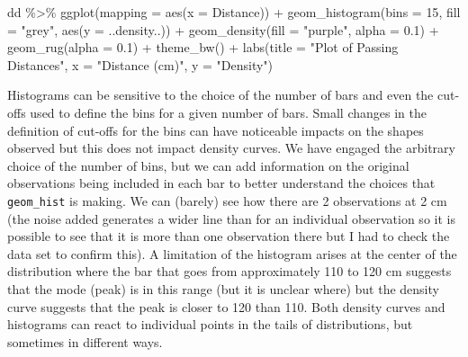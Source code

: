 \documentclass[
]{book}
\newenvironment{Shaded}{\begin{snugshade}}{\end{snugshade}}
\newcommand{\AttributeTok}[1]{\textcolor[rgb]{0.77,0.63,0.00}{#1}}
\newcommand{\DecValTok}[1]{\textcolor[rgb]{0.00,0.00,0.81}{#1}}
\newcommand{\FloatTok}[1]{\textcolor[rgb]{0.00,0.00,0.81}{#1}}
\newcommand{\FunctionTok}[1]{\textcolor[rgb]{0.00,0.00,0.00}{#1}}
\newcommand{\NormalTok}[1]{#1}
\newcommand{\SpecialCharTok}[1]{\textcolor[rgb]{0.00,0.00,0.00}{#1}}
\newcommand{\StringTok}[1]{\textcolor[rgb]{0.31,0.60,0.02}{#1}}
\begin{document}
\begin{Shaded}
\begin{Highlighting}[]
\NormalTok{dd }\SpecialCharTok{\%\textgreater{}\%} \FunctionTok{ggplot}\NormalTok{(}\AttributeTok{mapping =} \FunctionTok{aes}\NormalTok{(}\AttributeTok{x =}\NormalTok{ Distance)) }\SpecialCharTok{+}
  \FunctionTok{geom\_histogram}\NormalTok{(}\AttributeTok{bins =} \DecValTok{15}\NormalTok{, }\AttributeTok{fill =} \StringTok{"grey"}\NormalTok{, }\FunctionTok{aes}\NormalTok{(}\AttributeTok{y =}\NormalTok{ ..density..)) }\SpecialCharTok{+}
  \FunctionTok{geom\_density}\NormalTok{(}\AttributeTok{fill =} \StringTok{"purple"}\NormalTok{, }\AttributeTok{alpha =} \FloatTok{0.1}\NormalTok{) }\SpecialCharTok{+} 
  \FunctionTok{geom\_rug}\NormalTok{(}\AttributeTok{alpha =} \FloatTok{0.1}\NormalTok{) }\SpecialCharTok{+} 
  \FunctionTok{theme\_bw}\NormalTok{() }\SpecialCharTok{+}
  \FunctionTok{labs}\NormalTok{(}\AttributeTok{title =} \StringTok{"Plot of Passing Distances"}\NormalTok{,}
       \AttributeTok{x =} \StringTok{"Distance (cm)"}\NormalTok{,}
       \AttributeTok{y =} \StringTok{"Density"}\NormalTok{)}
\end{Highlighting}
\end{Shaded}

\indent Histograms can be sensitive to the choice of the number of bars and
even the cut-offs used to define the bins for a given number of bars.
Small changes in the definition of cut-offs for the bins can have
noticeable impacts on the shapes observed but
this does not impact density curves. We have engaged the arbitrary choice of the number of bins, but we can add information on the original observations being included in each bar to better understand the choices that \texttt{geom\_hist} is making. We can (barely) see how there are 2 observations at 2 cm (the noise
added generates a wider line than for an individual observation so it is possible to see that it is more than one observation there but I had to check the data set to confirm this). A limitation of the
histogram arises at the center of the distribution where the bar that goes from approximately 110 to 120 cm suggests that the mode (peak) is in this range (but it is unclear where) but the density curve suggests that the peak is closer to 120 than 110. Both density curves and histograms can react to individual points in the tails of distributions, but sometimes in different ways.
\end{document}

